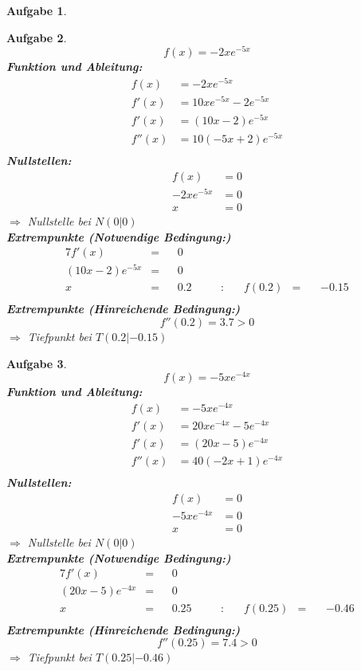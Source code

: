 \documentclass[12pt]{article}
\theoremstyle{note}
\newtheorem{aufgabe}{Aufgabe}
\begin{document}
\begin{flushleft}
\begin{aufgabe}
\end{aufgabe}\clearpage\begin{aufgabe} ~  
$$f(x)=- 2 x e^{- 5 x}$$ 
{\bf Funktion und Ableitung:} 
\begin{align*} 
f(x)&=- 2 x e^{- 5 x}\\ 
f'(x)&=10 x e^{- 5 x} - 2 e^{- 5 x}\\ 
f'(x)&=\left(10 x - 2\right) e^{- 5 x}\\ 
f''(x)&=10 \left(- 5 x + 2\right) e^{- 5 x}\\ 
\end{align*} 
{\bf Nullstellen:} 
\begin{align*} 
f(x)&=0 \\ 
- 2 x e^{- 5 x}&=0 \\ 
x&=0\end{align*} 
$\Rightarrow$ Nullstelle bei $N(0|0)$ \\ 
{\bf Extrempunkte (Notwendige Bedingung:)} 
\begin{alignat*}{7} 
f'(x)&=& &0& \\ 
\left(10 x - 2\right) e^{- 5 x}&=& &0& \\ 
x&=& &0.2& \quad &:& \quad f(0.2)&=& \, &-0.15\\ 
\end{alignat*} 
{\bf Extrempunkte (Hinreichende Bedingung:)} 
\\ 
$$f''(0.2)=3.7> 0 $$ 
$\Rightarrow$ Tiefpunkt bei $T(0.2|-0.15)$ \\ 

\end{aufgabe}\clearpage\begin{aufgabe} ~  
$$f(x)=- 5 x e^{- 4 x}$$ 
{\bf Funktion und Ableitung:} 
\begin{align*} 
f(x)&=- 5 x e^{- 4 x}\\ 
f'(x)&=20 x e^{- 4 x} - 5 e^{- 4 x}\\ 
f'(x)&=\left(20 x - 5\right) e^{- 4 x}\\ 
f''(x)&=40 \left(- 2 x + 1\right) e^{- 4 x}\\ 
\end{align*} 
{\bf Nullstellen:} 
\begin{align*} 
f(x)&=0 \\ 
- 5 x e^{- 4 x}&=0 \\ 
x&=0\end{align*} 
$\Rightarrow$ Nullstelle bei $N(0|0)$ \\ 
{\bf Extrempunkte (Notwendige Bedingung:)} 
\begin{alignat*}{7} 
f'(x)&=& &0& \\ 
\left(20 x - 5\right) e^{- 4 x}&=& &0& \\ 
x&=& &0.25& \quad &:& \quad f(0.25)&=& \, &-0.46\\ 
\end{alignat*} 
{\bf Extrempunkte (Hinreichende Bedingung:)} 
\\ 
$$f''(0.25)=7.4> 0 $$ 
$\Rightarrow$ Tiefpunkt bei $T(0.25|-0.46)$ \\ 


\end{aufgabe}
\end{flushleft}
\end{document}
